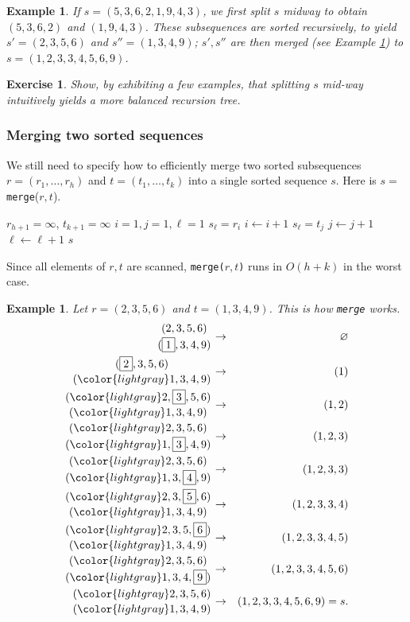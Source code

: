 \documentclass[a4paper]{book}
\theoremstyle{changebreak}                %
\newtheorem{eg}[result]{Example}
\newtheorem{ex}[result]{Exercise}
\begin{document}
\begin{eg}
If $s=(5,3,6,2,1,9,4,3)$, we first split $s$ midway to obtain
$(5,3,6,2)$ and $(1,9,4,3)$. These subsequences are sorted
recursively, to yield $s'=(2,3,5,6)$ and $s''=(1,3,4,9)$; $s',s''$ are
then merged (see Example \ref{eg:merge}) to $s=(1,2,3,3,4,5,6,9)$.
\end{eg}

\begin{ex}
Show, by exhibiting a few examples, that splitting $s$ mid-way
intuitively yields a more balanced recursion
tree.
\end{ex}

\subsubsection{Merging two sorted sequences}
We still need to specify how to efficiently
merge two sorted
subsequences $r=(r_1,\ldots,r_h)$ and
$t=(t_1,\ldots,t_k)$ into a single sorted
sequence $s$. Here is $s=${\tt merge}($r,t$).
\begin{algorithmic}[1]
\STATE $r_{h+1}=\infty$, $t_{k+1}=\infty$
\STATE $i=1,j=1,\ell=1$
     \STATE $s_\ell=r_i$
     \STATE $i\leftarrow i+1$
  \ELSE
     \STATE $s_\ell=t_j$
     \STATE $j\leftarrow j+1$
  \ENDIF
  \STATE $\ell\leftarrow\ell+1$
  \RETURN $s$
\ENDWHILE
\end{algorithmic}
Since all elements of $r,t$ are scanned, {\tt merge($r,t$)} runs in
$O(h+k)$ in the worst case.

\begin{eg}
\label{eg:merge}
Let $r=(2,3,5,6)$ and $t=(1,3,4,9)$. This is how {\tt merge} works.
\begin{eqnarray*}
{(2,3,5,6)\atop (\fbox{$1$},3,4,9)} &\to& \varnothing \\
{(\fbox{$2$},3,5,6)\atop ({\color{lightgray}1},3,4,9)} &\to& (1)\\ 
{({\color{lightgray}2},\fbox{$3$},5,6)\atop
 ({\color{lightgray}1},3,4,9)} &\to& (1,2) \\
{({\color{lightgray}2,3},5,6)\atop
 ({\color{lightgray}1},\fbox{$3$},4,9)} &\to& (1,2,3) \\
{({\color{lightgray}2,3},5,6)\atop
 ({\color{lightgray}1,3},\fbox{$4$},9)} &\to& (1,2,3,3) \\
{({\color{lightgray}2,3},\fbox{$5$},6)\atop
 ({\color{lightgray}1,3,4},9)} &\to& (1,2,3,3,4) \\
{({\color{lightgray}2,3,5},\fbox{$6$})\atop
 ({\color{lightgray}1,3,4},9)} &\to& (1,2,3,3,4,5) \\
{({\color{lightgray}2,3,5,6})\atop
 ({\color{lightgray}1,3,4},\fbox{$9$})} &\to& (1,2,3,3,4,5,6) \\
{({\color{lightgray}2,3,5,6})\atop
 ({\color{lightgray}1,3,4,9})} &\to& (1,2,3,3,4,5,6,9)=s.
\end{eqnarray*}
\end{eg}
\end{document}
